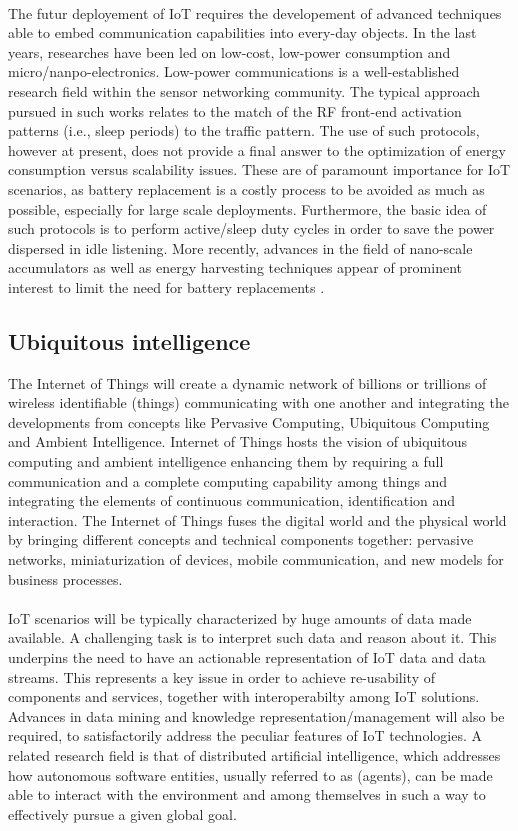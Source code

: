 \documentclass[10pt, twocolumn]{article}
\begin{document}
\paragraph{}
The futur deployement of IoT requires the developement of advanced techniques able to embed communication capabilities into every-day objects. In the last years, researches have been led on low-cost, low-power consumption and micro/nanpo-electronics.
Low-power communications is a well-established research field within the sensor networking community. The typical approach pursued in such works relates to the match of the RF front-end activation patterns (i.e., sleep periods) to the traffic pattern. The use of such protocols, however at present, does not provide a final answer to the optimization of energy consumption versus scalability issues.  These are of paramount importance for IoT scenarios, as battery replacement is a costly process to be avoided as much as possible, especially for large scale deployments. Furthermore, the basic idea of such protocols is to perform active/sleep duty cycles in order to save the power dispersed in idle listening.
More recently, advances in the field of nano-scale accumulators as well as energy harvesting techniques appear of prominent interest to limit the need for battery replacements \cite{ref17}.
\subsection{Ubiquitous intelligence}
The Internet of Things will create a dynamic network of billions or trillions of wireless identifiable (things) communicating with one another and integrating the developments from concepts like Pervasive Computing, Ubiquitous Computing and Ambient Intelligence. Internet of Things hosts the vision of ubiquitous computing and ambient intelligence enhancing them by requiring a full communication and a complete computing capability among things and integrating the elements of continuous communication,
identification and interaction. The Internet of Things fuses the digital world and the physical world by bringing different concepts and technical components together: pervasive networks, miniaturization of devices, mobile communication, and new models for business processes.
\paragraph{}
IoT scenarios will be typically characterized by huge amounts of data made available. A challenging task is to interpret such data and reason about it. This underpins the need to have an actionable representation of IoT data and data streams. This represents a key issue in order to achieve re-usability of components and services, together with interoperabilty among IoT solutions. Advances in data mining and knowledge representation/management will also be required, to satisfactorily address the peculiar features of IoT technologies. A related research field is that of distributed artificial intelligence, which addresses how autonomous software entities, usually referred to as (agents), can be made able to interact with the environment and among themselves in such a way to effectively pursue a given global goal\cite{ref15}.
\end{document}
